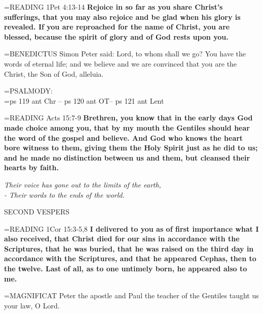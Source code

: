 \hangindent=\parindent \small{READING} 1Pet 4:13-14 \textbf{Rejoice in so far as you share Christ’s sufferings,
that you may also rejoice and be glad when his glory is revealed. If
you are reproached for the name of Christ, you are blessed, because
the spirit of glory and of God rests upon you.\\}
 
\hangindent=\parindent \small{BENEDICTUS  Simon Peter said: Lord, to whom shall we go? You have
the words of eternal life; and we believe and we are convinced that
you are the Christ, the Son of God, alleluia.\\}
 
\hangindent=\parindent \small{PSALMODY:}\\
\hangindent=\parindent  ps 119 ant Chr -- ps 120 ant OT-- ps 121 ant Lent\vspace{0.5em}

\hangindent=\parindent \small{READING} Acts 15:7-9 \textbf{Brethren, you know that in the early days God
made choice among you, that by my mouth the Gentiles should
hear the word of the gospel and believe. And God who knows the
heart bore witness to them, giving them the Holy Spirit just as he
did to us; and he made no distinction between us and them, but
cleansed their hearts by faith.\\}
 
\begin{center}
\textit{Their voice has gone out to the limits of the earth,\\
- Their words to the ends of the world.}
\end{center}

\begin{flushleft}\normalsize SECOND VESPERS\\\end{flushleft}

\hangindent=\parindent \small{READING} 1Cor 15:3-5,8 \textbf{I delivered to you as of first importance what I
also received, that Christ died for our sins in accordance with the
Scriptures, that he was buried, that he was raised on the third day
in accordance with the Scriptures, and that he appeared Cephas,
then to the twelve. Last of all, as to one untimely born, he appeared
also to me.\\}
 
\hangindent=\parindent \small{MAGNIFICAT  Peter the apostle and Paul the teacher of the Gentiles
taught us your law, O Lord.\\}
 

